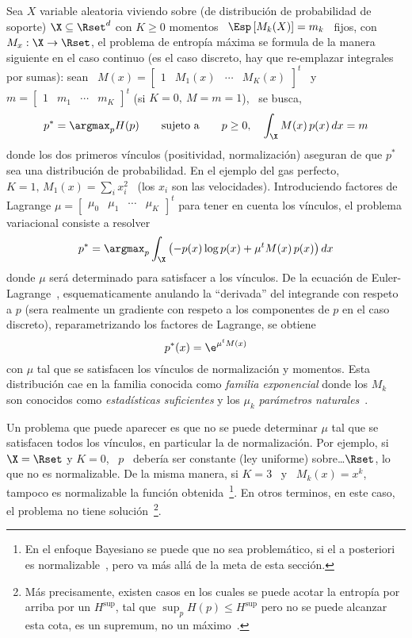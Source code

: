 Sea $X$ variable aleatoria viviendo  sobre (de distribuci\'on de probabilidad de
soporte)  $\X \subseteq \Rset^d$  con $K  \ge 0$  momentos \  $\Esp\left[ M_k(X)
\right]  = m_k$ \  fijos, con  $M_x: \X  \to \Rset$,  el problema  de entrop\'ia
m\'axima  se formula de  la manera  siguiente en  el caso  continuo (es  el caso
discreto,   hay  que   re-emplazar   integrales  por   sumas):   sean  \   $M(x)
=  \begin{bmatrix} 1  &  M_1(x) &  \cdots &  M_K(x)  \end{bmatrix}^t$ \  y \  $m
= \begin{bmatrix} 1 & m_1 & \cdots & m_K \end{bmatrix}^t$ (si $K = 0, \: M = m =
1$), \ se busca,
%
\[
p^* = \argmax_p H(p) \qquad \mbox{sujeto a} \qquad p \ge 0, \quad \int_\X M(x)
\, p(x) \, dx = m
\]
%
donde los dos primeros v\'inculos (positividad, normalizaci\'on) aseguran de que
$p^*$ sea una distribuci\'on de probabilidad. En el ejemplo del gas perfecto, $K
= 1, \, M_1(x) = \sum_i  x_i^2$ \ (los $x_i$ son las velocidades). Introduciendo
factores  de  Lagrange  $\mu  =   \begin{bmatrix}  \mu_0  &  \mu_1  &  \cdots  &
  \mu_K  \end{bmatrix}^t$  para tener  en  cuenta  los  v\'inculos, el  problema
variacional   consiste  a   resolver~\cite{GelFom63,  Bru04,   Mil00,  CamMar09,
  CovTho06}
%
\[
p^* = \argmax_p \int_\X \left( - p(x) \log p(x) + \mu^t M(x) \, p(x) \right) dx
\]
%
donde  $\mu$  ser\'a  determinado  para  satisfacer a  los  v\'inculos.   De  la
ecuaci\'on  de Euler-Lagrange~\cite{GelFom63, Bru04},  esquematicamente anulando
la ``derivada''  del integrande con respeto  a $p$ (sera  realmente un gradiente
con respeto a los componentes de  $p$ en el caso discreto), reparametrizando los
factores de Lagrange, se obtiene
%
\[
p^*(x) = \e^{\mu^t M(x)}
\]
%
con $\mu$  tal que se satisfacen  los v\'inculos de  normalizaci\'on y momentos.
Esta distribuci\'on  cae en la  familia conocida como {\it  familia exponencial}
donde  los $M_k$  son  conocidos  como {\it  estad\'isticas  suficientes} y  los
$\mu_k$ {\it par\'ametros naturales}~\cite{Dar35, Koo36, And70, Kay93, LehCas98,
  Rob07}.

Un problema que  puede aparecer es que  no se puede determinar $\mu$  tal que se
satisfacen  todos los  v\'inculos,  en particular  la  de normalizaci\'on.   Por
ejemplo,  si $\X  = \Rset$  y $K  = 0$,  \ $p$  \ deber\'ia  ser  constante (ley
uniforme) sobre\ldots $\Rset$, lo que no es normalizable. De la misma manera, si
$K  =  3$  \  y  \   $M_k(x)  =  x^k$,  tampoco  es  normalizable  la  funci\'on
obtenida~\footnote{En el  enfoque Bayesiano se puede que  no sea problem\'atico,
  si el  a posteriori es normalizable~\cite{Rob07},  pero va m\'as  all\'a de la
  meta de  esta secci\'on.}.  En  otros terminos, en  este caso, el  problema no
tiene soluci\'on~\footnote{M\'as  precisamente, existen  casos en los  cuales se
  puede acotar la entrop\'ia por arriba  por un $H^{\sup}$, tal que $\sup_p H(p)
  \le H^{\sup}$ pero no  se puede alcanzar esta cota, \ie es  un supremum, no un
  m\'aximo~\cite[sec.~12.3]{CovTho06}.}.

